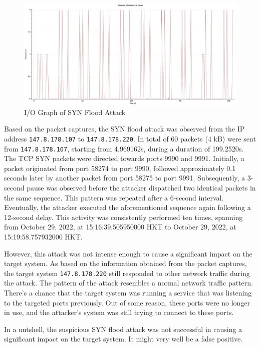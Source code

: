 \documentclass{article}
\begin{document}
    \begin{figure}[H]
        \centering
        \includegraphics[width=\textwidth]{image/107_220_syn_tcp.png}
        \caption{I/O Graph of SYN Flood Attack}
        \label{fig:syn-flood-io-graph}
    \end{figure}

    Based on the packet captures, the SYN flood attack was observed from the IP address \lstinline|147.8.178.107| to \lstinline|147.8.178.220|.
    In total of 60 packets (4 kB) were sent from \lstinline|147.8.178.107|, starting from 4.969162s, during a duration of 199.2520s.
    The TCP SYN packets were directed towards ports 9990 and 9991. 
    Initially, a packet originated from port 58274 to port 9990, followed approximately 0.1 seconds later by another packet from port 58275 to port 9991. 
    Subsequently, a 3-second pause was observed before the attacker dispatched two identical packets in the same sequence. 
    This pattern was repeated after a 6-second interval.
    Eventually, the attacker executed the aforementioned sequence again following a 12-second delay.
    This activity was consistently performed ten times, spanning from October 29, 2022, at 15:16:39.505950000 HKT to October 29, 2022, at 15:19:58.757932000 HKT.

    However, this attack was not intense enough to cause a significant impact on the target system.
    As based on the information obtained from the packet captures, the target system \lstinline|147.8.178.220| still responded to other network traffic during the attack.
    The pattern of the attack resembles a normal network traffic pattern. 
    There's a chance that the target system was running a service that was listening to the targeted ports previously.
    Out of some reason, these ports were no longer in use, and the attacker's system was still trying to connect to these ports.

    In a nutshell, the suspicious SYN flood attack was not successful in causing a significant impact on the target system.
    It might very well be a false positive.
\end{document}
